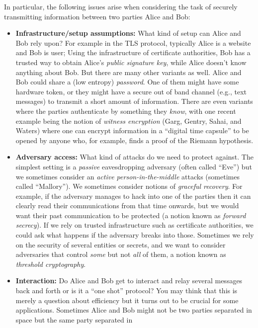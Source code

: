 In particular, the following issues arise when considering the task of
securely transmitting information between two parties Alice and Bob:

\begin{itemize}
\item
  \textbf{Infrastructure/setup assumptions:} What kind of setup can
  Alice and Bob rely upon? For example in the TLS protocol, typically
  Alice is a website and Bob is user; Using the infrastructure of
  certificate authorities, Bob has a trusted way to obtain Alice's
  \emph{public signature key}, while Alice doesn't know anything about
  Bob. But there are many other variants as well. Alice and Bob could
  share a (low entropy) \emph{password}. One of them might have some
  hardware token, or they might have a secure out of band channel (e.g.,
  text messages) to transmit a short amount of information. There are
  even variants where the parties authenticate by something they
  \emph{know}, with one recent example being the notion of \emph{witness
  encryption} (Garg, Gentry, Sahai, and Waters) where one can encrypt
  information in a ``digital time capsule'' to be opened by anyone who,
  for example, finds a proof of the Riemann hypothesis.
\item
  \textbf{Adversary access:} What kind of attacks do we need to protect
  against. The simplest setting is a \emph{passive} eavesdropping
  adversary (often called ``Eve'') but we sometimes consider an
  \emph{active person-in-the-middle} attacks (sometimes called
  ``Mallory''). We sometimes consider notions of \emph{graceful
  recovery}. For example, if the adversary manages to hack into one of
  the parties then it can clearly read their communications from that
  time onwards, but we would want their past communication to be
  protected (a notion known as \emph{forward secrecy}). If we rely on
  trusted infrastructure such as certificate authorities, we could ask
  what happens if the adversary breaks into those. Sometimes we rely on
  the security of several entities or secrets, and we want to consider
  adversaries that control \emph{some} but not \emph{all} of them, a
  notion known as \emph{threshold cryptography}.
\item
  \textbf{Interaction:} Do Alice and Bob get to interact and relay
  several messages back and forth or is it a ``one shot'' protocol? You
  may think that this is merely a question about efficiency but it turns
  out to be crucial for some applications. Sometimes Alice and Bob might
  not be two parties separated in space but the same party separated in

\end{itemize}
